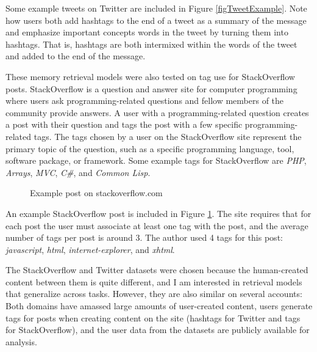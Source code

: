 \documentclass[man,floatsintext,donotrepeattitle]{apa6}
\begin{document}
Some example tweets on Twitter are included in Figure \ref{figTweetExample}.
Note how users both add hashtags to the end of a tweet as a summary of the message and emphasize important concepts words in the tweet by turning them into hashtags.
That is, hashtags are both intermixed within the words of the tweet and added to the end of the message.

These memory retrieval models were also tested on tag use for StackOverflow posts.
StackOverflow is a question and answer site for computer programming where users ask programming-related questions and fellow members of the community provide answers.
A user with a programming-related question creates a post with their question and tags the post with a few specific programming-related tags. 
The tags chosen by a user on the StackOverflow site represent the primary topic of the question, such as a specific programming language, tool, software package, or framework.
Some example tags for StackOverflow are \emph{PHP}, \emph{Arrays}, \emph{MVC}, \emph{C\#}, and \emph{Common Lisp}.

\begin{figure}[!htbp]
  \caption{Example post on stackoverflow.com}
  \label{figSOExample}
\end{figure}

An example StackOverflow post is included in Figure \ref{figSOExample}.
The site requires that for each post the user must associate at least one tag with the post, and the average number of tags per post is around 3.
The author used 4 tags for this post: \emph{javascript}, \emph{html}, \emph{internet-explorer}, and \emph{xhtml}.

The StackOverflow and Twitter datasets were chosen because the human-created content between them is quite different, and I am interested in retrieval models that generalize across tasks.
However, they are also similar on several accounts:
Both domains have amassed large amounts of user-created content, users generate tags for posts when creating content on the site (hashtags for Twitter and tags for StackOverflow),
and the user data from the datasets are publicly available for analysis.
\end{document}
